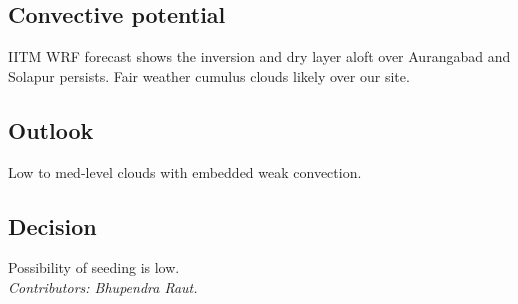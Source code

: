 \subsection*{Convective potential}
IITM WRF forecast shows the inversion and dry layer aloft over Aurangabad and Solapur persists. 
Fair weather cumulus clouds likely over our site. %


\subsection*{Outlook}
Low to med-level clouds with embedded weak convection.\\
\subsection*{Decision}
Possibility of seeding is low.\\

\vfill %
\textit{Contributors: Bhupendra Raut.} 

